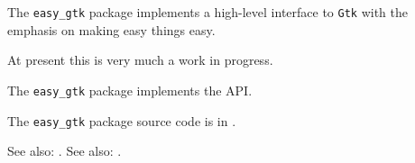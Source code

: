 
The {\tt easy\_gtk} package implements a high-level interface to 
{\tt Gtk} with the emphasis on making easy things easy.

At present this is very much a work in progress.

The {\tt easy\_gtk} package implements the  API.

The {\tt easy\_gtk} package source code is in .

See also:  .\newline
See also:  .


